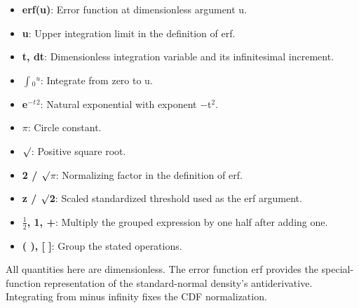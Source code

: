 \documentclass[11pt,a4paper]{article}
\begin{document}
\begin{samepage}
\begin{itemize}\setlength{\itemsep}{1pt}\setlength{\parsep}{0pt}
\item \textbf{erf(u)}: Error function at dimensionless argument u.
\item \textbf{u}: Upper integration limit in the definition of erf.
\item \textbf{t, dt}: Dimensionless integration variable and its infinitesimal increment.
\item \textbf{\ensuremath{\int}\ensuremath{{}_0}\ensuremath{{}^u}}: Integrate from zero to u.
\item \textbf{e\ensuremath{{}^-}\ensuremath{{}^t}\ensuremath{{}^2}}: Natural exponential with exponent \ensuremath{-}t\ensuremath{{}^2}.
\item \textbf{\ensuremath{\pi}}: Circle constant.
\item \textbf{\ensuremath{\sqrt{\vphantom{x}}}}: Positive square root.
\item \textbf{2 / \ensuremath{\sqrt{\vphantom{x}}}\ensuremath{\pi}}: Normalizing factor in the definition of erf.
\item \textbf{z / \ensuremath{\sqrt{\vphantom{x}}}2}: Scaled standardized threshold used as the erf argument.
\item \textbf{\ensuremath{\tfrac12}, 1, +}: Multiply the grouped expression by one half after adding one.
\item \textbf{( ), [ ]}: Group the stated operations.
\end{itemize}

All quantities here are dimensionless. The error function erf provides the special-function representation of the standard-normal density's antiderivative. Integrating from minus infinity fixes the CDF normalization.

\end{samepage}
\medskip
\end{document}
